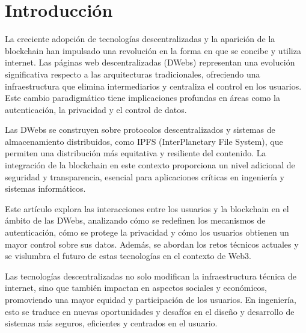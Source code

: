 \section{Introducción}

La creciente adopción de tecnologías descentralizadas y la aparición de la blockchain han impulsado una revolución en la forma en que se concibe y utiliza internet. Las páginas web descentralizadas (DWebs) representan una evolución significativa respecto a las arquitecturas tradicionales, ofreciendo una infraestructura que elimina intermediarios y centraliza el control en los usuarios. Este cambio paradigmático tiene implicaciones profundas en áreas como la autenticación, la privacidad y el control de datos.

Las DWebs se construyen sobre protocolos descentralizados y sistemas de almacenamiento distribuidos, como IPFS (InterPlanetary File System), que permiten una distribución más equitativa y resiliente del contenido. La integración de la blockchain en este contexto proporciona un nivel adicional de seguridad y transparencia, esencial para aplicaciones críticas en ingeniería y sistemas informáticos.

Este artículo explora las interacciones entre los usuarios y la blockchain en el ámbito de las DWebs, analizando cómo se redefinen los mecanismos de autenticación, cómo se protege la privacidad y cómo los usuarios obtienen un mayor control sobre sus datos. Además, se abordan los retos técnicos actuales y se vislumbra el futuro de estas tecnologías en el contexto de Web3.

Las tecnologías descentralizadas no solo modifican la infraestructura técnica de internet, sino que también impactan en aspectos sociales y económicos, promoviendo una mayor equidad y participación de los usuarios. En ingeniería, esto se traduce en nuevas oportunidades y desafíos en el diseño y desarrollo de sistemas más seguros, eficientes y centrados en el usuario.

